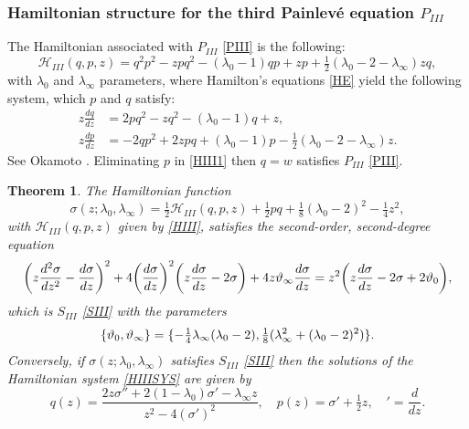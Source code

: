 \documentclass[12pt]{article}
\def\P{Painlev\'e }
\newtheorem{mydef}{Theorem}[section]
\numberwithin{figure}{section}
\numberwithin{equation}{section}
\numberwithin{table}{section}
\begin{document}
\subsubsection{Hamiltonian structure for the third \P equation $P_{III}$}
The Hamiltonian associated with $P_{III}$ \eqref{PIII} is the following:
\begin{equation}
\mathcal{H}_{III}(q,p,z) = q^2p^2-zpq^2-(\lambda_0-1)qp+zp+\tfrac{1}{2}(\lambda_0-2-\lambda_\infty)zq,\label{HIII}
\end{equation} with $\lambda_0$ and $\lambda_{\infty}$ parameters,
where Hamilton's equations \eqref{HE} yield the following system, which $p$ and $q$ satisfy:
\begin{subequations}\label{HIIISYS}
\begin{align}
z\frac{dq}{dz}&=2pq^2-zq^2-(\lambda_0-1)q+z,\label{HIII1}\\\label{HIII2}
z\frac{dp}{dz}&=-2qp^2+2zpq+(\lambda_0-1)p-\tfrac{1}{2}(\lambda_0-2-\lambda_\infty)z.
\end{align}
\end{subequations}
See Okamoto \cite{P:2:525,P:30:305}.
Eliminating $p$ in \eqref{HIII1} then $q=w$ satisfies $P_{III}$ \eqref{PIII}.
\begin{mydef} The Hamiltonian function
\begin{equation}
\sigma(z;\lambda_0,\lambda_\infty)=\tfrac{1}{2}\mathcal{H}_{III}(q,p,z)+\tfrac{1}{2}pq+\tfrac{1}{8}(\lambda_0-2)^2-\tfrac{1}{4}z^2,\label{HA3}
\end{equation}
with $\mathcal{H}_{III}(q,p,z)$ given by \eqref{HIII}, satisfies the second-order, second-degree equation
$$
\bigg(z\frac{d^2\sigma}{dz^2}-\frac{d\sigma}{dz}\bigg)^2+4\bigg(\frac{d\sigma}{dz}\bigg)^2\bigg(z\frac{d\sigma}{dz}-2\sigma\bigg)+4z\vartheta_\infty\frac{d\sigma}{dz}=z^2
\bigg(z\frac{d\sigma}{dz}-2\sigma+2\vartheta_0\bigg),
$$
which is $S_{III}$ \eqref{SIII} with the parameters
$$\{\vartheta_0,\vartheta_\infty\}=\{-\tfrac{1}{4}\lambda_\infty(\lambda_0-2),\tfrac{1}{8}(\lambda^2_\infty+(\lambda_0-2)^2)\}.$$
Conversely, if $\sigma(z;\lambda_0,\lambda_\infty)$ satisfies
$S_{III}$ \eqref{SIII} then the solutions of the Hamiltonian system \eqref{HIIISYS} are given by
\begin{equation}\label{PIIIpandq}
q(z)=\frac { 2z\sigma''+2(1-\lambda_0)\sigma'-\lambda_\infty z}{z^2-4(\sigma')^2},\quad
p(z)=\sigma'+\tfrac{1}{2}z,\quad'=\frac{d}{dz}.
\end{equation}
\end{mydef}
\end{document}
